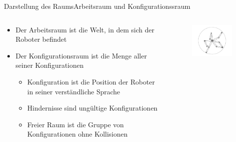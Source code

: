 \documentclass[t,aspectratio=169,dvipsnames]{beamer}
\begin{document}
\begin{frame}{Darstellung des Raums}{Arbeitsraum und Konfigurationssraum}
	\begin{columns}
		\begin{column}[T]{0.6\textwidth}
			\begin{itemize}
				\item Der Arbeitsraum ist die Welt, in dem sich der Roboter befindet\newline
				\item Der Konfigurationsraum ist die Menge aller seiner Konfigurationen
				\begin{itemize}
					\item Konfiguration ist die Position der Roboter in seiner verständliche Sprache
					\item Hindernisse sind ungültige Konfigurationen
					\item Freier Raum ist die Gruppe von Konfigurationen ohne Kollisionen
				\end{itemize}
			\end{itemize}
		\end{column}
		\begin{column}[T]{0.4\textwidth}
			\begin{figure}
				\includegraphics[width=4.5cm]{images/Bild2.png}
			\end{figure}
		\end{column}
	\end{columns}
\end{frame}
\end{document}
